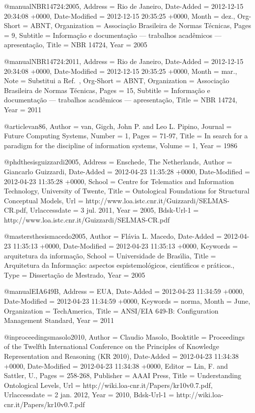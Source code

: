 @manual{NBR14724:2005,
	Address = {Rio de Janeiro},
	Date-Added = {2012-12-15 20:34:08 +0000},
	Date-Modified = {2012-12-15 20:35:25 +0000},
	Month = {dez.},
	Org-Short = {ABNT},
	Organization = {Associa{\c c}\~ao Brasileira de Normas T\'ecnicas},
	Pages = 9,
	Subtitle = {Informa{\c c}\~ao e documenta{\c c}\~ao --- trabalhos acad\^emicos --- apresenta{\c c}\~ao},
	Title = {{NBR} 14724},
	Year = 2005}

@manual{NBR14724:2011,
	Address = {Rio de Janeiro},
	Date-Added = {2012-12-15 20:34:08 +0000},
	Date-Modified = {2012-12-15 20:35:25 +0000},
	Month = {mar.},
	Note = {Substitui a Ref.~},
	Org-Short = {ABNT},
	Organization = {Associa{\c c}\~ao Brasileira de Normas T\'ecnicas},
	Pages = 15,
	Subtitle = {Informa{\c c}\~ao e documenta{\c c}\~ao --- trabalhos acad\^emicos --- apresenta{\c c}\~ao},
	Title = {{NBR} 14724},
	Year = 2011}

@article{van86,
	Author = {{van}, Gigch, John P. and Leo L. Pipino},
	Journal = {Future Computing Systems},
	Number = {1},
	Pages = {71-97},
	Title = {In search for a paradigm for the discipline of information systems},
	Volume = {1},
	Year = {1986}}

@phdthesis{guizzardi2005,
	Address = {Enschede, The Netherlands},
	Author = {Giancarlo Guizzardi},
	Date-Added = {2012-04-23 11:35:28 +0000},
	Date-Modified = {2012-04-23 11:35:28 +0000},
	School = {Centre for Telematics and Information Technology, University of Twente},
	Title = {Ontological Foundations for Structural Conceptual Models},
	Url = {http://www.loa.istc.cnr.it/Guizzardi/SELMAS-CR.pdf},
	Urlaccessdate = {3 jul. 2011},
	Year = {2005},
	Bdsk-Url-1 = {http://www.loa.istc.cnr.it/Guizzardi/SELMAS-CR.pdf}}

@mastersthesis{macedo2005,
	Author = {Fl{\'a}via L. Macedo},
	Date-Added = {2012-04-23 11:35:13 +0000},
	Date-Modified = {2012-04-23 11:35:13 +0000},
	Keywords = {arquitetura da informa{\c c}{\~a}o},
	School = {Universidade de Bras{\'\i}lia},
	Title = {Arquitetura da Informa{\c c}{\~a}o: aspectos espistemol{\'o}gicos, cient{\'\i}ficos e pr{\'a}ticos.},
	Type = {Disserta{\c c}{\~a}o de Mestrado},
	Year = {2005}}

@manual{EIA649B,
	Address = {EUA},
	Date-Added = {2012-04-23 11:34:59 +0000},
	Date-Modified = {2012-04-23 11:34:59 +0000},
	Keywords = {norma},
	Month = {June},
	Organization = {TechAmerica},
	Title = {ANSI/EIA 649-B: Configuration Management Standard},
	Year = {2011}}

@inproceedings{masolo2010,
	Author = {Claudio Masolo},
	Booktitle = {Proceedings of the Twelfth International Conference on the Principles of Knowledge Representation and Reasoning (KR 2010)},
	Date-Added = {2012-04-23 11:34:38 +0000},
	Date-Modified = {2012-04-23 11:34:38 +0000},
	Editor = {Lin, F. and Sattler, U.},
	Pages = {258-268},
	Publisher = {AAAI Press},
	Title = {Understanding Ontological Levels},
	Url = {http://wiki.loa-cnr.it/Papers/kr10v0.7.pdf},
	Urlaccessdate = {2 jan. 2012},
	Year = {2010},
	Bdsk-Url-1 = {http://wiki.loa-cnr.it/Papers/kr10v0.7.pdf}}

